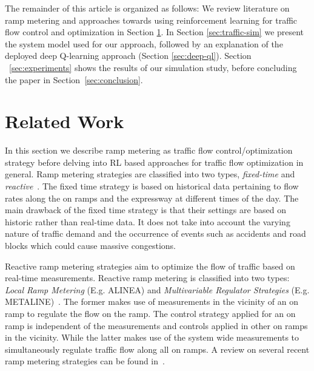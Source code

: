 \documentclass{sig-alternate-05-2015}
\begin{document}
The remainder of this article is organized as follows:
We review literature on ramp metering and approaches towards using reinforcement learning for traffic flow control and optimization in Section \ref{sec:rel-work}.
In Section \ref{sec:traffic-sim} we present the system model used for our approach, followed by an explanation of the deployed deep Q-learning approach (Section \ref{sec:deep-ql}).
Section ~\ref{sec:experiments} shows the results of our simulation study, before concluding the paper in Section~\ref{sec:conclusion}.

\section{Related Work}
\label{sec:rel-work}

In this section we describe ramp metering as traffic flow control/optimization strategy before delving into RL based approaches for traffic flow optimization in general. Ramp metering strategies are classified into two types, {\it fixed-time} and {\it reactive}~\cite{papageorgiou2003review}. The fixed time strategy is based on historical data pertaining to flow rates along the on ramps and the expressway at different times of the day. The main drawback of the fixed time strategy is that their settings are based on historic rather than real-time data. It does not take into account the varying nature of traffic demand and the occurrence of events such as accidents and road blocks which could cause massive congestions. 
  
Reactive ramp metering strategies aim to optimize the flow of traffic based on real-time measurements. Reactive ramp metering is classified into two types: {\it Local Ramp Metering} (E.g. ALINEA) and {\it Multivariable Regulator Strategies} (E.g. METALINE)~\cite{papageorgiou2003review}. The former makes use of measurements in the vicinity of an on ramp to regulate the flow on the ramp. The control strategy applied for an on ramp is independent of the measurements and controls applied in other on ramps in the vicinity. While the latter makes use of the system wide measurements to simultaneously regulate traffic flow along all on ramps. A review on several recent ramp metering strategies can be found in~\cite{shaaban2016literature}.
\end{document}
